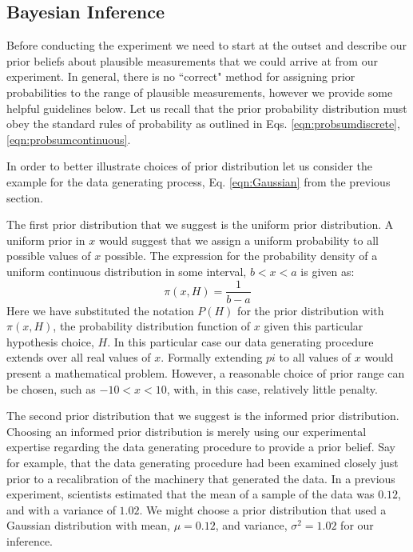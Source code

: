 \subsection{Bayesian Inference}
Before conducting the experiment we need to start at the outset and describe our prior beliefs about plausible measurements that we could arrive at from our experiment. In general, there is no ``correct" method for assigning prior probabilities to the range of plausible measurements, however we provide some helpful guidelines below. Let us recall that the prior probability distribution must obey the standard rules of probability as outlined in Eqs. \ref{eqn:probsumdiscrete}, \ref{eqn:probsumcontinuous}.

In order to better illustrate choices of prior distribution let us consider the example for the data generating process, Eq. \ref{eqn:Gaussian} from the previous section.

The first prior distribution that we suggest is the uniform prior distribution. A uniform prior in $x$ would suggest that we assign a uniform probability to all possible values of $x$ possible. The expression for the probability density of a uniform continuous distribution in some interval, $b < x < a$ is given as:
\begin{equation}
    \pi(x, H) = \frac{1}{b - a}
\end{equation}
Here we have substituted the notation $P(H)$ for the prior distribution with $\pi(x, H)$, the probability distribution function of $x$ given this particular hypothesis choice, $H$. In this particular case our data generating procedure extends over all real values of $x$. Formally extending $pi$ to all values of $x$ would present a mathematical  problem. However, a reasonable choice of prior range can be chosen, such as $-10 < x < 10$, with, in this case, relatively little penalty.

The second prior distribution that we suggest is the informed prior distribution. Choosing an informed prior distribution is merely using our experimental expertise regarding the data generating procedure to provide a prior belief. Say for example, that the data generating procedure had been examined closely just prior to a recalibration of the machinery that generated the data. In a previous experiment, scientists estimated that the mean of a sample of the data was $0.12$, and with a variance of $1.02$. We might choose a prior distribution that used a Gaussian distribution with mean, $\mu = 0.12$, and variance, $\sigma^2 = 1.02$ for our inference. 

